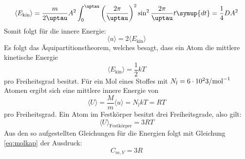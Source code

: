\begin{equation}
  \langle E_\text{kin} \rangle = \frac{m}{2\uptau} A^2 \int_0^\uptau \left(\frac{2\pi}{\uptau}\right)^2 \sin^2{\frac{2\pi}{\uptau}t} \symup{dt} = \frac{1}{4}DA^2
\end{equation}
Somit folgt für die innere Energie:
\begin{equation}
  \langle u \rangle = 2 \langle E_\text{kin} \rangle
\end{equation}
Es folgt das Äquipartitionstheorem, welches besagt, dass ein Atom die mittlere kinetische Energie
\begin{equation}
  \langle E_\text{kin} \rangle = \frac{1}{2}kT
\end{equation}
pro Freiheitsgrad besitzt.
Für ein Mol eines Stoffes mit $N_l=6 \cdot 10^23/\si[per-mode=reciprocal]{\per\mol}$\cite{v201} Atomen ergibt sich eine mittlere innere Energie von
\begin{equation}
  \langle U \rangle = \frac{M}{m} \langle u \rangle = N_l k T = R T
\end{equation}
pro Freiheitsgrad.
Ein Atom im Festkörper besitzt drei Freiheitsgrade, also gilt:
\begin{equation}
  \langle U \rangle _\text{Festkörper}= 3 R T
\end{equation}
Aus den so aufgestellten Gleichungen für die Energien folgt mit Gleichung \eqref{eq:molkap} der Ausdruck:
\begin{equation}
\label{eqn:peitsche}
C_{m,V} = 3R
\end{equation}
